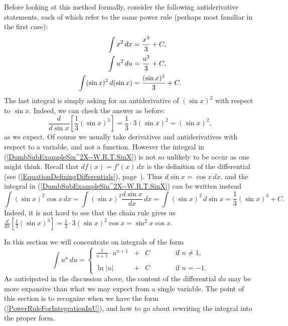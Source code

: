 Before looking at this method formally, consider the following
antiderivative statements, each of which refer to the 
same power rule (perhaps most familiar in the first case):
\begin{align}
\int x^2\,dx&=\frac{x^3}3+C,\notag\\
\int u^2\,du&=\frac{u^3}3+C,\notag\\
\int (\sin x)^2\,d(\sin x)&=\frac{(\sin x)^3}3+C.
     \label{DumbSubExampleSin^2X--W.R.T.SinX}
\end{align}
The last integral is simply asking for an antiderivative of
$(\sin x)^2$ with respect to $\sin x$.  Indeed, we can check the
answer as before:
$$\frac{d}{d\sin x}\left[\frac13(\sin x)^3\right]
    =\frac13\cdot 3(\sin x)^2=(\sin x)^2,$$
as we expect.  Of course we usually take derivatives and antiderivatives
with respect to a variable, and not a function.  However the
integral in (\ref{DumbSubExampleSin^2X--W.R.T.SinX})
is not so unlikely to be occur as one might think. 
Recall that $df(x)=f'(x)\,dx$
is the definition of the differential (see
(\ref{EquationDefiningDifferentials}), 
page~\pageref{EquationDefiningDifferentials}).  Thus
$d\sin x=\cos x\,dx$, and the integral
in (\ref{DumbSubExampleSin^2X--W.R.T.SinX}) can be written instead
$$\int(\sin x)^2\cos x\,dx=\int(\sin x)^2\frac{d\sin x}{dx}\,dx
                          =\int(\sin x)^2\,d\sin x
                          =\frac13(\sin x)^3+C.$$
Indeed, it is not hard to see that the chain rule gives
us $\frac{d}{dx}\left[
\frac13(\sin x)^3\right]=\frac13\cdot3(\sin x)^2\cos x
=\sin^2x\cos x$. 

In this section we will concentrate on integrals of the form
\begin{equation}\int u^n\,du=\left\{\begin{array}{lclcl}
             \frac1{n+1}\cdot u^{n+1}&+&C&\qquad&\text{if }n\ne1,\\ \\
             \ln|u|&+&C&&\text{if }n=-1.\end{array}\right.
             \label{PowerRuleForIntegrationInU}
       \end{equation}
As anticipated in the discussion above, the content of the differential
$du$ may be more expansive than what we may expect from a single variable.
The point of this section is to recognize when we have the form
(\ref{PowerRuleForIntegrationInU}), and how to go about rewriting the
integral into the proper form.  

